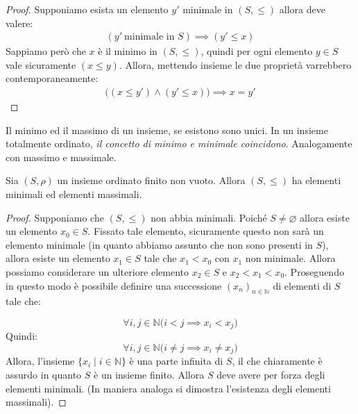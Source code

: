 \begin{proof}
	Supponiamo esista un elemento $y'$ minimale in $(S,\leq)$ allora deve valere:
	\begin{align*}
		(y' \ \text{minimale in $S$}) \implies  (y' \leq x)
	\end{align*}
	Sappiamo però che $x$ è il minimo in $(S,\leq)$, quindi per ogni elemento $y \in S$ vale sicuramente  $(x \leq y)$. Allora, mettendo insieme le due proprietà varrebbero contemporaneamente:
	\begin{align*}
		\bigl((x \leq y') \land (y' \leq x) \bigr) \implies x=y'
	\end{align*}
\end{proof}

Il minimo ed il massimo di un insieme, se esistono sono unici. In un insieme totalmente ordinato, \textit{il concetto di minimo e minimale coincidono}. Analogamente con massimo e massimale.


\begin{teorbox}
	Sia $(S,\rho)$ un insieme ordinato finito non vuoto. Allora $(S,\leq )$ ha elementi minimali ed elementi massimali.
\end{teorbox}

\begin{proof}
	Supponiamo che $(S,\leq )$ non abbia minimali. Poiché $S \neq \varnothing$ allora esiste un elemento $x_{0} \in S$. Fissato tale elemento, sicuramente questo non sarà un elemento minimale  (in quanto abbiamo assunto che non sono presenti in $S$), allora esiste un elemento $x_{1} \in S$ tale che $x_{1} < x_{0}$ con $x_{1}$ non minimale. Allora possiamo considerare un ulteriore elemento $x_{2} \in S$ e $x_{2} < x_{1} < x_{0}$. Proseguendo in questo modo è possibile definire una successione $(x_{n})_{n \in \mathbb{N}}$ di elementi di $S$ tale che:
	
	\begin{displaymath}
		\forall i,j \in \mathbb{N} \bigl( i<j \implies x_{i} < x_{j}\bigr)
	\end{displaymath}
	Quindi:
	\begin{displaymath}
		\forall i,j \in \mathbb{N} \bigl(i \neq j \implies x_{i} \neq x_{j}\bigr)
	\end{displaymath}
	Allora, l'insieme $	\{x_{i} \; | \; i \in \mathbb{N}\}$ è una parte infinita di $S$, il che chiaramente è assurdo in quanto $S$ è un insieme finito. Allora $S$ deve avere per forza degli elementi minimali. (In maniera analoga si dimostra l'esistenza degli elementi massimali). 
\end{proof}


